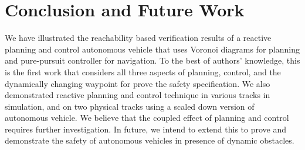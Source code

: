 \section{Conclusion and Future Work}
We  have illustrated the reachability based verification results of a reactive planning and control autonomous vehicle that uses Voronoi diagrams for planning and pure-pursuit controller for navigation. 
To the best of authors' knowledge, this is the first work that considers all three aspects of planning, control, and the dynamically changing waypoint for prove the safety specification.
%
We also demonstrated reactive planning and control technique in various tracks in simulation, and on two physical tracks using a scaled down version of autonomous vehicle. 
%
We believe that the coupled effect of planning and control requires further investigation.
%
In future, we intend to extend this to prove and demonstrate the safety of autonomous vehicles in presence of dynamic obstacles.
%
